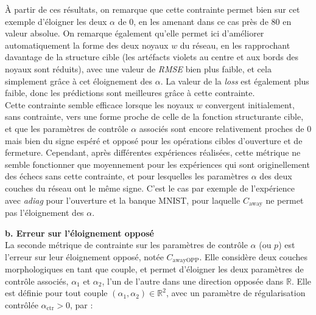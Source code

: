 \vspace{-1.6mm}
\noindent À partir de ces résultats, on remarque que cette contrainte permet bien sur cet exemple d'éloigner les deux $\alpha$ de $0$, en les amenant dans ce cas près de $80$ en valeur absolue. On remarque également qu'elle permet ici d'améliorer automatiquement la forme des deux noyaux $w$ du réseau, en les rapprochant davantage de la structure cible (les artéfacts violets au centre et aux bords des noyaux sont réduits), avec une valeur de \textit{RMSE} bien plus faible, et cela simplement grâce à cet éloignement des $\alpha$. La valeur de la \textit{loss} est également plus faible, donc les prédictions sont meilleures grâce à cette contrainte. \\

\vspace{-0.2mm}
Cette contrainte semble efficace lorsque les noyaux $w$ convergent initialement, sans contrainte, vers une forme proche de celle de la fonction structurante cible, et que les paramètres de contrôle $\alpha$ associés sont encore relativement proches de $0$ mais bien du signe espéré et opposé pour les opérations cibles d'ouverture et de fermeture.
Cependant, après différentes expériences réalisées, cette métrique ne semble fonctionner que moyennement pour les expériences qui sont originellement des échecs sans cette contrainte, et pour lesquelles les paramètres $\alpha$ des deux couches du réseau ont le même signe. C'est le cas par exemple de l'expérience avec \textit{adiag} pour l'ouverture et la banque MNIST, pour laquelle $C_\text{away}$ ne permet pas l'éloignement des $\alpha$.




\newpage

\noindent \textbf{b. Erreur sur l'éloignement opposé}\\

La seconde métrique de contrainte sur les paramètres de contrôle $\alpha$ (ou $p$) est l'erreur sur leur éloignement opposé, notée $C_\text{awayOPP}$. Elle considère deux couches morphologiques en tant que couple, et permet d'éloigner les deux paramètres de contrôle associés, $\alpha_1$ et $\alpha_2$, l'un de l'autre dans une direction opposée dans $\mathbb{R}$. Elle est définie pour tout couple $(\alpha_1,\alpha_2) \in \mathbb{R}^2$, avec un paramètre de régularisation contrôlée $\alpha_\text{ctr} > 0$, par : \\

